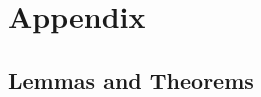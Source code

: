 \documentclass[11pt]{article}
\theoremstyle{definition}
\begin{document}

\vspace*{-0.5cm}

%
\vspace*{-0.5cm}
\section{Appendix}
\vspace*{-0.2cm}
\subsection{Lemmas and Theorems}
\label{ssec:proof}
\end{document}

